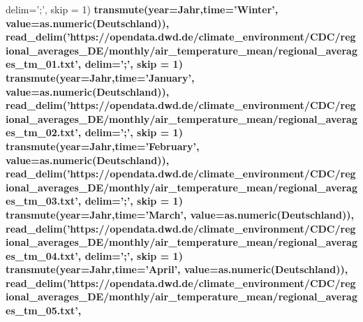 \documentclass[
]{article}
\newenvironment{Shaded}{\begin{snugshade}}{\end{snugshade}}
\newcommand{\DataTypeTok}[1]{\textcolor[rgb]{0.13,0.29,0.53}{#1}}
\newcommand{\DecValTok}[1]{\textcolor[rgb]{0.00,0.00,0.81}{#1}}
\newcommand{\KeywordTok}[1]{\textcolor[rgb]{0.13,0.29,0.53}{\textbf{#1}}}
\newcommand{\NormalTok}[1]{#1}
\newcommand{\OperatorTok}[1]{\textcolor[rgb]{0.81,0.36,0.00}{\textbf{#1}}}
\newcommand{\StringTok}[1]{\textcolor[rgb]{0.31,0.60,0.02}{#1}}
\begin{document}
\begin{Shaded}
\begin{Highlighting}[]
{{{{{               \DataTypeTok{delim=}\StringTok{';'}\NormalTok{, }\DataTypeTok{skip =} \DecValTok{1}\NormalTok{) }\OperatorTok{%
\StringTok{      }\KeywordTok{transmute}\NormalTok{(}\DataTypeTok{year=}\NormalTok{Jahr,}\DataTypeTok{time=}\StringTok{'Winter'}\NormalTok{, }\DataTypeTok{value=}\KeywordTok{as.numeric}\NormalTok{(Deutschland)),}
    \KeywordTok{read_delim}\NormalTok{(}\StringTok{'https://opendata.dwd.de/climate_environment/CDC/regional_averages_DE/monthly/air_temperature_mean/regional_averages_tm_01.txt'}\NormalTok{,}
               \DataTypeTok{delim=}\StringTok{';'}\NormalTok{, }\DataTypeTok{skip =} \DecValTok{1}\NormalTok{) }\OperatorTok{%
\StringTok{      }\KeywordTok{transmute}\NormalTok{(}\DataTypeTok{year=}\NormalTok{Jahr,}\DataTypeTok{time=}\StringTok{'January'}\NormalTok{, }\DataTypeTok{value=}\KeywordTok{as.numeric}\NormalTok{(Deutschland)),}
    \KeywordTok{read_delim}\NormalTok{(}\StringTok{'https://opendata.dwd.de/climate_environment/CDC/regional_averages_DE/monthly/air_temperature_mean/regional_averages_tm_02.txt'}\NormalTok{,}
               \DataTypeTok{delim=}\StringTok{';'}\NormalTok{, }\DataTypeTok{skip =} \DecValTok{1}\NormalTok{) }\OperatorTok{%
\StringTok{      }\KeywordTok{transmute}\NormalTok{(}\DataTypeTok{year=}\NormalTok{Jahr,}\DataTypeTok{time=}\StringTok{'February'}\NormalTok{, }\DataTypeTok{value=}\KeywordTok{as.numeric}\NormalTok{(Deutschland)),}
    \KeywordTok{read_delim}\NormalTok{(}\StringTok{'https://opendata.dwd.de/climate_environment/CDC/regional_averages_DE/monthly/air_temperature_mean/regional_averages_tm_03.txt'}\NormalTok{,}
               \DataTypeTok{delim=}\StringTok{';'}\NormalTok{, }\DataTypeTok{skip =} \DecValTok{1}\NormalTok{) }\OperatorTok{%
\StringTok{      }\KeywordTok{transmute}\NormalTok{(}\DataTypeTok{year=}\NormalTok{Jahr,}\DataTypeTok{time=}\StringTok{'March'}\NormalTok{, }\DataTypeTok{value=}\KeywordTok{as.numeric}\NormalTok{(Deutschland)),}
    \KeywordTok{read_delim}\NormalTok{(}\StringTok{'https://opendata.dwd.de/climate_environment/CDC/regional_averages_DE/monthly/air_temperature_mean/regional_averages_tm_04.txt'}\NormalTok{,}
               \DataTypeTok{delim=}\StringTok{';'}\NormalTok{, }\DataTypeTok{skip =} \DecValTok{1}\NormalTok{) }\OperatorTok{%
\StringTok{      }\KeywordTok{transmute}\NormalTok{(}\DataTypeTok{year=}\NormalTok{Jahr,}\DataTypeTok{time=}\StringTok{'April'}\NormalTok{, }\DataTypeTok{value=}\KeywordTok{as.numeric}\NormalTok{(Deutschland)),}
    \KeywordTok{read_delim}\NormalTok{(}\StringTok{'https://opendata.dwd.de/climate_environment/CDC/regional_averages_DE/monthly/air_temperature_mean/regional_averages_tm_05.txt'}\NormalTok{,}
}}}}}}}}}}
\end{Highlighting}
\end{Shaded}
\end{document}

